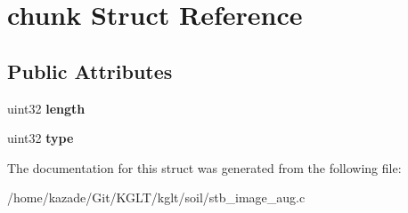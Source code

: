 \hypertarget{structchunk}{\section{chunk Struct Reference}
\label{structchunk}
}
\subsection*{Public Attributes}
\begin{DoxyCompactItemize}
\item 
\hypertarget{structchunk_a0b5cc0c5a9b91945c42373db2a499fb1}{uint32 {\bfseries length}}\label{structchunk_a0b5cc0c5a9b91945c42373db2a499fb1}

\item 
\hypertarget{structchunk_a05d5489f3807bc7ba149c1904241d087}{uint32 {\bfseries type}}\label{structchunk_a05d5489f3807bc7ba149c1904241d087}

\end{DoxyCompactItemize}


The documentation for this struct was generated from the following file\-:\begin{DoxyCompactItemize}
\item 
/home/kazade/\-Git/\-K\-G\-L\-T/kglt/soil/stb\-\_\-image\-\_\-aug.\-c\end{DoxyCompactItemize}
